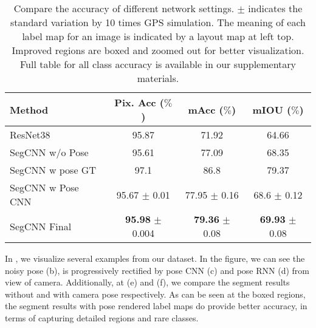 \begin{table}
\center
\fontsize{8}{9}\selectfont
\begin{tabular}{lccc}
\toprule[0.1 em]
Method &Pix. Acc ($\%$) &  mAcc ($\%$) & mIOU ($\%$) \\
\hline
ResNet38~\cite{WuSH16e} & 95.87 & 71.92 & 64.66 \\
SegCNN w/o Pose & 95.61 & 77.09 & 68.35 \\
SegCNN w pose GT & 97.1 & 86.8 & 79.37 \\
SegCNN w Pose CNN & 95.67 $\pm$ 0.01 & 77.95 $\pm$ 0.16 & 68.6 $\pm$ 0.12\\
SegCNN Final & \textbf{95.98} $\pm$ 0.004 & \textbf{79.36} $\pm$ 0.08 & \textbf{69.93} $\pm$ 0.08 \\
\toprule[0.1 em]
\end{tabular}
\caption{Compare the accuracy of different network settings. $\pm$ indicates the standard variation by 10 times GPS simulation. 
The meaning of each label map for an image is indicated by a layout map at left top. Improved regions are boxed and zoomed out for better visualization.
Full table for all class accuracy is available in our supplementary materials.}
\label{tbl:segment}
\vspace{-0.3\baselineskip}
\end{table}

In , we visualize several examples from our dataset. In the figure, we can see the noisy pose (b), is progressively rectified by pose CNN (c) and pose RNN (d) from view of camera. Additionally, at (e) and (f), we compare the segment results without and with camera pose respectively. As can be seen at the boxed regions, the segment results with pose rendered label maps do provide better accuracy, in terms of capturing detailed regions and rare classes.
